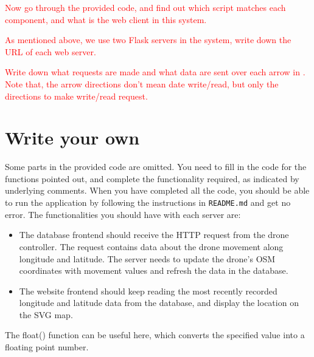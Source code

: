 \documentclass{article}
\begin{document}
\parbox[t]{13cm}{\textcolor{red}{Now go through the provided code, and find out which script matches each component, and what is the web client in this system.}}\vspace{0.5cm}

\parbox[t]{13cm}{\textcolor{red}{As mentioned above, we use two Flask servers in the system, write down the URL of each web server.}}\vspace{0.5cm}

\parbox[t]{13cm}{\textcolor{red}{Write down what requests are made and what data are sent over each arrow in . Note that, the arrow directions don't mean date write/read, but only the directions to make write/read request.}}\vspace{0.5cm}

\section{Write your own}

Some parts in the provided code are omitted. You need to fill in the code for the functions pointed out, and complete the functionality required, as indicated by underlying comments. When you have completed all the code, you should be able to run the application by following the instructions in \verb!README.md! and get no error. The functionalities you should have with each server are:
\begin{itemize}
    \item The database frontend should receive the HTTP request from the drone controller. The request contains data about the drone movement along longitude and latitude. The server needs to update the drone's OSM coordinates with movement values and refresh the data in the database.
    \item The website frontend should keep reading the most recently recorded longitude and latitude data from the database, and display the location on the SVG map.
\end{itemize}

\parbox[t]{14cm}{{The float() function can be useful here, which converts the specified value into a floating point number.\cite{fl}}}\vspace{0.2cm}
\end{document}
